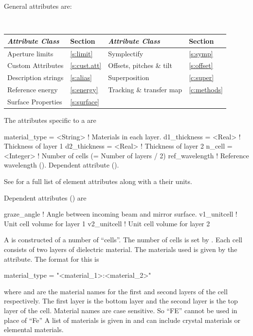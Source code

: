 {General  attributes are:
\begin{center}
\tt
\begin{tabular}{llll} \toprule
  {\sl Attribute Class}      & Section           & {\sl Attribute Class}      & Section         \\ \midrule
  Aperture limits            & \ref{s:limit}     & Symplectify                & \ref{s:symp}    \\
  Custom Attributes          & \ref{s:cust.att}  & Offsets, pitches \& tilt   & \ref{s:offset}  \\
  Description strings        & \ref{s:alias}     & Superposition              & \ref{c:super}   \\
  Reference energy           & \ref{s:energy}    & Tracking \& transfer map   & \ref{c:methods} \\
  Surface Properties         & \ref{s:surface}   &                            &                 \\
  \bottomrule
\end{tabular}
\end{center}
\toffset

The attributes specific to a  are 
\begin{example}
  material_type    = <String>  ! Materials in each layer.
  d1_thickness     = <Real>    ! Thickness of layer 1
  d2_thickness     = <Real>    ! Thickness of layer 2
  n_cell           = <Integer> ! Number of cells (= Number of layers / 2)
  ref_wavelength               ! Reference wavelength (). Dependent attribute ().
\end{example}
See  for a full list of element attributes along with a their units.

Dependent attributes () are
\begin{example}
  graze_angle      ! Angle between incoming beam and mirror surface.
  v1_unitcell      ! Unit cell volume for layer 1
  v2_unitcell      ! Unit cell volume for layer 2 
\end{example}

A  is constructed of a number of ``cells''. The
number of cells is set by . Each cell consists of two
layers of dielectric material. The materials used is given by
the  attribute. The format for this is
\begin{example}
  material_type = "<material_1>:<material_2>"
\end{example}
where  and  are the material names
for the first and second layers of the cell respectively. The first
layer is the bottom layer and the second layer is the top layer of the
cell.  Material names are case sensitive. So ``FE'' cannot be used in
place of ``Fe'' A list of materials is given in 
and can include crystal materials or elemental materials.

}
